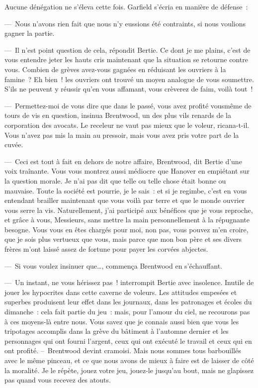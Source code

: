 \documentclass[french,twoside]{book} %
\begin{document}
Aucune dénégation ne s’éleva cette fois. Garfield s’écria en manière de défense :\par
— Nous n’avons rien fait que nous n’y eussions été contraints, si nous voulions gagner la partie.\par
— Il n’est point question de cela, répondit Bertie. Ce dont je me plains, c’est de vous entendre jeter les hauts cris maintenant que la situation se retourne contre vous. Combien de grèves avez-vous gagnées en réduisant les ouvriers à la famine ? Eh bien ! les ouvriers ont trouvé un moyen analogue de vous soumettre. S’ils ne peuvent y réussir qu’en vous affamant, vous crèverez de faim, voilà tout !\par
— Permettez-moi de vous dire que dans le passé, vous avez profité vousmême de tours de vis en question, insinua Brentwood, un des plus vils renards de la corporation des avocats. Le receleur ne vaut pas mieux que le voleur, ricana-t-il. Vous n’avez pas mis la main au pressoir, mais vous avez pris votre part de la cuvée.\par
— Ceci est tout à fait en dehors de notre affaire, Brentwood, dit Bertie d’une voix traînante. Vous vous montrez aussi médiocre que Hanover en empiétant sur la question morale. Je n’ai pas dit que telle ou telle chose était bonne ou mauvaise. Toute la société est pourrie, je le sais : et si je regimbe, c’est en vous entendant brailler maintenant que vous voilà par terre et que le monde ouvrier vous serre la vis. Naturellement, j’ai participé aux bénéfices que je vous reproche, et grâce à vous, Messieurs, sans mettre la main personnellement à la répugnante besogne. Vous vous en êtes chargés pour moi, non pas, vous pouvez m’en croire, que je sois plus vertueux que vous, mais parce que mon bon père et ses divers frères m’ont laissé assez de fortune pour payer les corvées abjectes.\par
— Si vous voulez insinuer que…, commença Brentwood en s’échauffant.\par
— Un instant, ne vous hérissez pas ! interrompit Bertie avec insolence. Inutile de jouer les hypocrites dans cette caverne de voleurs. Les attitudes empesées et superbes produisent leur effet dans les journaux, dans les patronages et écoles du dimanche : cela fait partie du jeu : mais, pour l’amour du ciel, ne recourons pas à ces moyens-là entre nous. Vous savez que je connais aussi bien que vous les tripotages accomplis dans la grève du bâtiment à l’automne dernier et les personnages qui ont fourni l’argent, ceux qui ont exécuté le travail et ceux qui en ont profité. – Brentwood devint cramoisi. Mais nous sommes tous barbouillés avec le même pinceau, et ce que nous avons de mieux à faire est de laisser de côté la moralité. Je le répète, jouez votre jeu, jouez-le jusqu’au bout, mais ne glapissez pas quand vous recevez des atouts.\par
\end{document}
